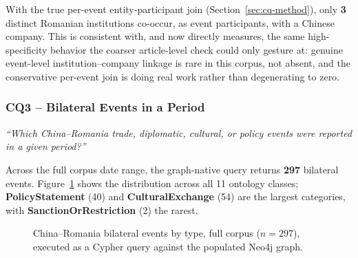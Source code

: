 \documentclass[conference]{IEEEtran}
\begin{document}
With the true per-event entity-participant join (Section~\ref{sec:cq-method}),
only \textbf{3} distinct Romanian institutions co-occur, as event
participants, with a Chinese company. This is consistent with, and now
directly measures, the same high-specificity behavior the coarser
article-level check could only gesture at: genuine event-level
institution--company linkage is rare in this corpus, not absent, and the
conservative per-event join is doing real work rather than degenerating to
zero.

\subsubsection{CQ3 -- Bilateral Events in a Period}
\textit{``Which China--Romania trade, diplomatic, cultural, or policy events were reported in a given period?''}

Across the full corpus date range, the graph-native query returns
\textbf{297} bilateral events. Figure~\ref{fig:timeline} shows the
distribution across all 11 ontology classes; \textbf{PolicyStatement} (40)
and \textbf{CulturalExchange} (54) are the largest categories, with
\textbf{SanctionOrRestriction} (2) the rarest.

\begin{figure}[htbp]
\centering
{}
\caption{China--Romania bilateral events by type, full corpus ($n=297$), executed as a Cypher query against the populated Neo4j graph.}
\label{fig:timeline}
\end{figure}
\end{document}
